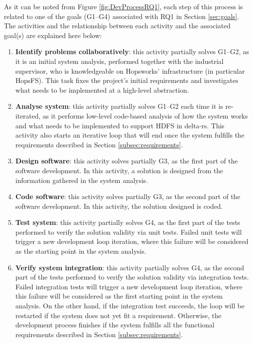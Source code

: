 As it can be noted from Figure \ref{fig:DevProcessRQ1}, each step of this process is related to one of the goals (G1--G4) associated with RQ1 in Section \ref{sec:goals}.
The activities and the relationship between each activity and the associated goal(s) are explained here below:
\begin{enumerate}
    \item \textbf{Identify problems collaboratively}: this activity partially solves G1--G2, as it is an initial system analysis, performed together with the industrial supervisor, who is knowledgeable on Hopsworks' infrastructure (in particular \gls{HopsFS}). This task fixes the project's initial requirements and investigates what needs to be implemented at a high-level abstraction.
    \item \textbf{Analyse system}: this activity partially solves G1--G2 each time it is re-iterated, as it performs low-level code-based analysis of how the system works and what needs to be implemented to support \gls{HDFS} in delta-rs. This activity also starts an iterative loop that will end once the system fulfills the requirements described in Section \ref{subsec:requirements}.
    \item \textbf{Design software}: this activity solves partially G3, as the first part of the software development. In this activity, a solution is designed from the information gathered in the system analysis.
    \item \textbf{Code software}: this activity solves partially G3, as the second part of the software development. In this activity, the solution designed is coded.
    \item \textbf{Test system}: this activity partially solves G4, as the first part of the tests performed to verify the solution validity via unit tests. Failed unit tests will trigger a new development loop iteration, where this failure will be considered as the starting point in the system analysis.
    \item \textbf{Verify system integration}: this activity partially solves G4, as the second part of the tests performed to verify the solution validity via integration tests. Failed integration tests will trigger a new development loop iteration, where this failure will be considered as the first starting point in the system analysis. On the other hand, if the integration test succeeds, the loop will be restarted if the system does not yet fit a requirement. Otherwise, the development process finishes if the system fulfills all the functional requirements described in Section \ref{subsec:requirements}.
\end{enumerate}

